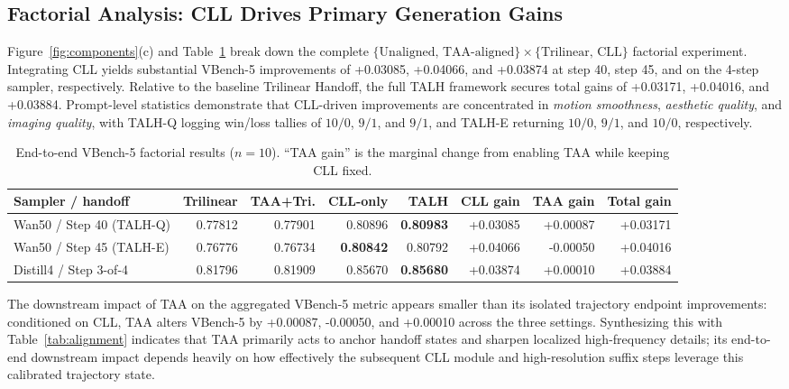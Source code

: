\subsection{Factorial Analysis: CLL Drives Primary Generation Gains}

Figure~\ref{fig:components}(c) and Table~\ref{tab:factorial} break down the complete
\(\{\text{Unaligned, TAA-aligned}\} \times \{\text{Trilinear, CLL}\}\)
factorial experiment. Integrating CLL yields substantial VBench-5
improvements of +0.03085, +0.04066, and +0.03874 at step 40, step 45,
and on the 4-step sampler, respectively. Relative to the baseline
Trilinear Handoff, the full TALH framework secures total gains of
+0.03171, +0.04016, and +0.03884. Prompt-level statistics demonstrate
that CLL-driven improvements are concentrated in \emph{motion
smoothness}, \emph{aesthetic quality}, and \emph{imaging quality}, with
TALH-Q logging win/loss tallies of \(10/0\), \(9/1\), and \(9/1\), and
TALH-E returning \(10/0\), \(9/1\), and \(10/0\), respectively.

\begin{table}[t]
\centering
\small
\begin{tabular}{lrrrrrrr}
\toprule
Sampler / handoff & Trilinear & TAA+Tri. & CLL-only & TALH & CLL gain & TAA gain & Total gain \\
\midrule
Wan50 / Step 40 (TALH-Q) & 0.77812 & 0.77901 & 0.80896 & \textbf{0.80983} & +0.03085 & +0.00087 & +0.03171 \\
Wan50 / Step 45 (TALH-E) & 0.76776 & 0.76734 & \textbf{0.80842} & 0.80792 & +0.04066 & -0.00050 & +0.04016 \\
Distill4 / Step 3-of-4 & 0.81796 & 0.81909 & 0.85670 & \textbf{0.85680} & +0.03874 & +0.00010 & +0.03884 \\
\bottomrule
\end{tabular}
\caption{End-to-end VBench-5 factorial results ($n=10$). ``TAA gain''
is the marginal change from enabling TAA while keeping CLL fixed.}
\label{tab:factorial}
\end{table}

The downstream impact of TAA on the aggregated VBench-5 metric appears
smaller than its isolated trajectory endpoint improvements: conditioned
on CLL, TAA alters VBench-5 by +0.00087, -0.00050, and +0.00010 across
the three settings. Synthesizing this with Table~\ref{tab:alignment} indicates that TAA
primarily acts to anchor handoff states and sharpen localized
high-frequency details; its end-to-end downstream impact depends heavily
on how effectively the subsequent CLL module and high-resolution suffix
steps leverage this calibrated trajectory state.

